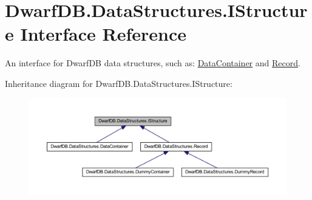 \hypertarget{interface_dwarf_d_b_1_1_data_structures_1_1_i_structure}{
\section{DwarfDB.DataStructures.IStructure Interface Reference}
\label{interface_dwarf_d_b_1_1_data_structures_1_1_i_structure}
}


An interface for DwarfDB data structures, such as: \hyperlink{class_dwarf_d_b_1_1_data_structures_1_1_data_container}{DataContainer} and \hyperlink{class_dwarf_d_b_1_1_data_structures_1_1_record}{Record}.  




Inheritance diagram for DwarfDB.DataStructures.IStructure:\nopagebreak
\begin{figure}[H]
\begin{center}
\leavevmode
\includegraphics[width=400pt]{interface_dwarf_d_b_1_1_data_structures_1_1_i_structure__inherit__graph}
\end{center}
\end{figure}
